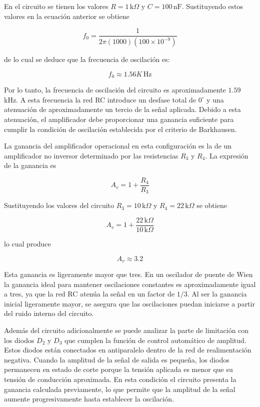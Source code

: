 \documentclass[a4paper,openany,12pt]{book}
\begin{document}
En el circuito se tienen los valores \(R = 1\,\text{k}\Omega\) y \(C = 100\,\text{nF}\). Sustituyendo estos valores en la ecuación anterior se obtiene

\[
f_0 = \frac{1}{2\pi (1000)(100 \times 10^{-9})}
\]

de lo cual se deduce que la frecuencia de oscilación es:

\[
f_0 \approx 1.56K \, \text{Hz}
\]

Por lo tanto, la frecuencia de oscilación del circuito es aproximadamente \(1.59\) kHz. A esta frecuencia la red RC introduce un desfase total de \(0^{\circ}\) y una atenuación de aproximadamente un tercio de la señal aplicada. Debido a esta atenuación, el amplificador debe proporcionar una ganancia suficiente para cumplir la condición de oscilación establecida por el criterio de Barkhausen.

La ganancia del amplificador operacional en esta configuración es la de un amplificador no inversor determinado por las resistencias \(R_3\) y \(R_4\). La expresión de la ganancia es

\[
A_v = 1 + \frac{R_4}{R_3}
\]

Sustituyendo los valores del circuito \(R_3 = 10\,\text{k}\Omega\) y \(R_4 = 22\,\text{k}\Omega\) se obtiene

\[
A_v = 1 + \frac{22\,\text{k}\Omega}{10\,\text{k}\Omega}
\]

lo cual produce

\[
A_v \approx 3.2
\]

Esta ganancia es ligeramente mayor que tres. En un oscilador de puente de Wien la ganancia ideal para mantener oscilaciones constantes es aproximadamente igual a tres, ya que la red RC atenúa la señal en un factor de \(1/3\). Al ser la ganancia inicial ligeramente mayor, se asegura que las oscilaciones puedan iniciarse a partir del ruido interno del circuito.

Además del circuito adicionalmente se puede analizar la parte de limitación con los diodos \(D_2\) y \(D_3\) que cumplen la función de control automático de amplitud. Estos diodos están conectados en antiparalelo dentro de la red de realimentación negativa. Cuando la amplitud de la señal de salida es pequeña, los diodos permanecen en estado de corte porque la tensión aplicada es menor que su tensión de conducción aproximada. En esta condición el circuito presenta la ganancia calculada previamente, lo que permite que la amplitud de la señal aumente progresivamente hasta establecer la oscilación.
\end{document}

